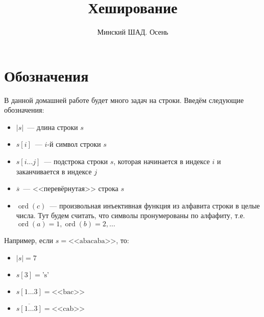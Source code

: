 \documentclass[addpoints]{exam}
\title{Хеширование}
\author{Минский ШАД. Осень}
\DeclareMathOperator{\ord}{ord}
\begin{document}
\printanswers
\maketitle

\section{Обозначения}

В данной домашней работе будет много задач на строки. Введём следующие обозначения:

\begin{itemize}
\item $|s|$~--- длина строки $s$
\item $s[i]$~--- $i$-й символ строки $s$
\item $s[i \ldots j]$~--- подстрока строки $s$, которая начинается в индексе $i$ и заканчивается в индексе $j$
\item $\overline{s}$~--- <<перевёрнутая>> строка $s$ 
\item $\ord(c)$~--- произвольная инъективная функция из алфавита строки в целые числа. Тут будем считать, что символы пронумерованы по алфафиту, т.е. $\ord(a) = 1, \ord(b) = 2, \ldots$ 
\end{itemize}

Например, если $s = \mbox{<<abacaba>>}$, то:

\begin{itemize}
\item $|s| = 7$ 
\item $s[3] = \mbox{'s'}$
\item $s[1\ldots3] = \mbox{<<bac>>}$
\item $\overline{s[1 \ldots 3]} = \mbox{<<cab>>}$  
\end{itemize}
\end{document}
